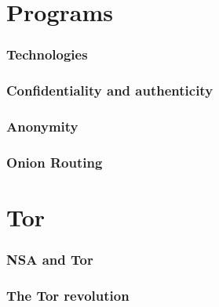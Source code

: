 \section{Programs}
\begin{frame}
	\frametitle{Technologies}
\end{frame}

\begin{frame}
	\frametitle{Confidentiality and authenticity}
\end{frame}

\begin{frame}
	\frametitle{Anonymity}
\end{frame}

\begin{frame}
	\frametitle{Onion Routing}
\end{frame}

\section{Tor}

\begin{frame}
	\frametitle{NSA and Tor}
\end{frame}

\begin{frame}
	\frametitle{The Tor revolution}
\end{frame}

